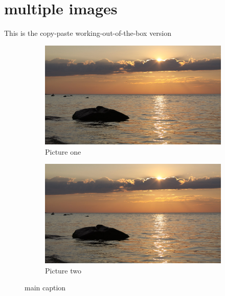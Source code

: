 \documentclass[12pt]{report}
\begin{document}
\section{multiple images}
This is the copy-paste working-out-of-the-box version 
\begin{figure}[h!]
\centering
    \begin{subfigure}[t]{0.35\textwidth}
        \centering
        \includegraphics[width=\textwidth]{demo}
        \caption{Picture one}
        \label{fig:one}
    \end{subfigure}
    \begin{subfigure}[t]{0.35\textwidth}
        \centering
        \includegraphics[width=\textwidth]{demo}
        \caption{Picture two}
        \label{fig:two}
    \end{subfigure}
\caption{main caption}
\label{fig:main}
\end{figure}
\end{document}
